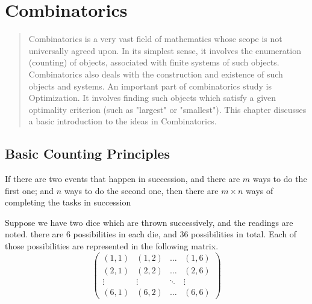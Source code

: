 \chapter{Combinatorics}
\begin{abstract}
    Combinatorics is a very vast field of mathematics whose scope is not universally agreed upon. In its simplest sense, it involves the enumeration (counting) of objects, associated with finite systems of such objects. Combinatorics also deals with the construction and existence of such objects and systems. An important part of combinatorics study is Optimization. It involves finding such objects which satisfy a given optimality criterion (such as "largest" or "smallest"). This chapter discusses a basic introduction to the ideas in Combinatorics.
\end{abstract}

\section{Basic Counting Principles}
\begin{theorem} 
    If there are two events that happen  in succession, and there are \mbox{$m$} ways to do the first one; and \mbox{$n$} ways to do the second one, then there are \mbox{$m\times n$} ways of completing the tasks in succession
\end{theorem}

\begin{example}
    Suppose we have two dice which are thrown successively, and the readings are noted. there are 6 possibilities in each die, and 36 possibilities in total. Each of those possibilities are represented in the following matrix.
    \begin{equation*}
        \begin{pmatrix}
            (1,1)  & (1,2)  & \dots  & (1,6)  \\
            (2,1)  & (2,2)  & \dots  & (2,6)  \\
            \vdots & \vdots & \ddots & \vdots \\
            (6,1)  & (6,2)  & \dots  & (6,6)
        \end{pmatrix}
    \end{equation*}
\end{example}

